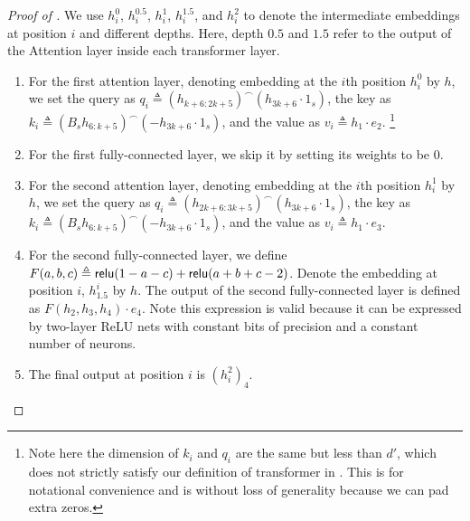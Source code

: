 \begin{proof}[Proof of ]
	We use $h^0_i$, $h^{0.5}_i$, $h^1_i$, $h^{1.5}_i$, and $h^2_i$ to denote the intermediate embeddings at position $i$ and different depths. Here, depth $0.5$ and $1.5$ refer to the output of the Attention layer inside each transformer layer. 
	\begin{enumerate}[leftmargin=*] 
		\item 	For the first attention layer, denoting embedding at the $i$th position $h_i^0$ by $h$, we set the query as $q_i \triangleq \left(h_{k+6:2k+5}\right)^\frown \left(h_{3k+6}\cdot 1_s\right)$, the key as $k_i\triangleq \left(B_sh_{6:k+5}\right)^\frown \left(-h_{3k+6}\cdot 1_s\right)$, and the value as $v_i\triangleq h_1 \cdot e_2$. \footnote{Note here the dimension of $k_i$ and $q_i$ are the same but less than $d'$, which does not strictly satisfy our definition of transformer in . This is for notational convenience and is without loss of generality because we can pad extra zeros.}
		\item For the first fully-connected layer, we skip it by setting its weights to be $0$.
		\item For the second attention layer, denoting embedding at the $i$th position $h_i^1$ by $h$, we set the query as $q_i \triangleq \left(h_{2k+6:3k+5}\right)^\frown \left(h_{3k+6}\cdot 1_s\right)$, the key as $k_i\triangleq \left(B_sh_{6:k+5}\right)^\frown \left(-h_{3k+6}\cdot 1_s\right)$, and the value as $v_i\triangleq h_1 \cdot e_3$. 
		\item For the second fully-connected layer, we define $F(a,b,c)\triangleq \mathsf{relu}(1-a-c) + \mathsf{relu}(a+b+c-2)$. Denote  the embedding at position $i$, $h_{1.5}^i$ by $h$. The output of the second fully-connected layer is defined as $F(h_2, h_3, h_4)\cdot e_4$. Note this expression is valid because it can be expressed by two-layer ReLU nets with constant bits of precision and a constant number of neurons.
		\item The final output at position $i$ is $(h_i^2)_4$. 
	\end{enumerate}
	

\end{proof}
